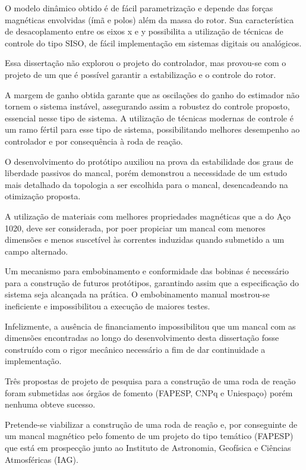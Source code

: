 O modelo dinâmico obtido é de fácil parametrização e depende das forças magnéticas envolvidas (ímã e polos) além da massa do rotor. Sua característica de desacoplamento entre os eixos x e y possibilita a utilização de técnicas de controle do tipo SISO, de fácil implementação em sistemas digitais ou analógicos.

Essa dissertação não explorou o projeto do controlador, mas provou-se com o projeto de um que é possível garantir a estabilização e o controle do rotor.

A margem de ganho obtida garante que as oscilações do ganho do estimador não tornem o sistema instável, assegurando assim a robustez do controle proposto, essencial nesse tipo de sistema. A utilização de técnicas modernas de controle é um ramo fértil para esse tipo de sistema, possibilitando melhores desempenho ao controlador e por consequência à roda de reação. 

O desenvolvimento do protótipo auxiliou na prova da estabilidade dos graus de liberdade passivos do mancal, porém demonstrou a necessidade de um estudo mais detalhado da topologia a ser escolhida para o mancal, desencadeando na otimização proposta.

A utilização de materiais com melhores propriedades magnéticas que a do Aço 1020, deve ser considerada, por poer propiciar um mancal com menores dimensões e menos suscetível às correntes induzidas \citep{Ravaud2009} quando submetido a um campo alternado.

Um mecanismo para embobinamento e conformidade das bobinas é necessário para a construção de futuros protótipos, garantindo assim que a especificação do sistema seja alcançada na prática. O embobinamento manual mostrou-se ineficiente e impossibilitou a execução de maiores testes.

Infelizmente, a ausência de financiamento impossibilitou que um mancal com as dimensões encontradas ao longo do desenvolvimento desta dissertação fosse construído com o rigor mecânico necessário a fim de dar continuidade a implementação.

Três propostas de projeto de pesquisa para a construção de uma roda de reação foram submetidas aos órgãos de fomento (FAPESP, CNPq e Uniespaço) porém nenhuma obteve sucesso. 

Pretende-se viabilizar a construção de uma roda de reação e, por conseguinte de um mancal magnético pelo fomento de um projeto do tipo temático (FAPESP) que está em prospecção junto ao Instituto de Astronomia, Geofísica e Ciências Atmosféricas (IAG).


